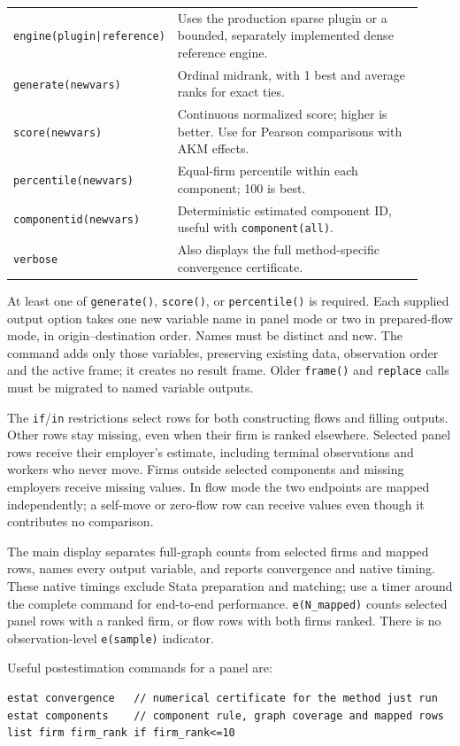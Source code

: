 \documentclass[11pt]{article}
\begin{document}
{\begin{longtable}{@{}L{0.30\linewidth}L{0.62\linewidth}@{}}
\texttt{engine(plugin|reference)} & Uses the production sparse plugin or a bounded, separately implemented dense reference engine. \\
\texttt{generate(newvars)} & Ordinal midrank, with 1 best and average ranks for exact ties. \\
\texttt{score(newvars)} & Continuous normalized score; higher is better. Use for Pearson comparisons with AKM effects. \\
\texttt{percentile(newvars)} & Equal-firm percentile within each component; 100 is best. \\
\texttt{componentid(newvars)} & Deterministic estimated component ID, useful with \texttt{component(all)}. \\
\texttt{verbose} & Also displays the full method-specific convergence certificate. \\
\bottomrule
\end{longtable}
}

At least one of \texttt{generate()}, \texttt{score()}, or
\texttt{percentile()} is required. Each supplied output option takes one
new variable name in panel mode or two in prepared-flow mode, in
origin--destination order. Names must be distinct and new. The command adds
only those variables, preserving existing data, observation order and the
active frame; it creates no result frame. Older \texttt{frame()} and
\texttt{replace} calls must be migrated to named variable outputs.

The \texttt{if}/\texttt{in} restrictions select rows for both constructing
flows and filling outputs. Other rows stay missing, even when their firm is
ranked elsewhere. Selected panel rows receive their employer's estimate,
including terminal observations and workers who never move. Firms outside
selected components and missing employers receive missing values. In flow
mode the two endpoints are mapped independently; a self-move or zero-flow
row can receive values even though it contributes no comparison.

The main display separates full-graph counts from selected firms and mapped
rows, names every output variable, and reports convergence and native timing.
These native timings exclude Stata preparation and matching; use a timer
around the complete command for end-to-end performance. \texttt{e(N\_mapped)}
counts selected panel rows with a ranked firm, or flow rows with both firms
ranked. There is no observation-level \texttt{e(sample)} indicator.

Useful postestimation commands for a panel are:
\begin{lstlisting}
estat convergence   // numerical certificate for the method just run
estat components    // component rule, graph coverage and mapped rows
list firm firm_rank if firm_rank<=10
\end{lstlisting}
\end{document}
